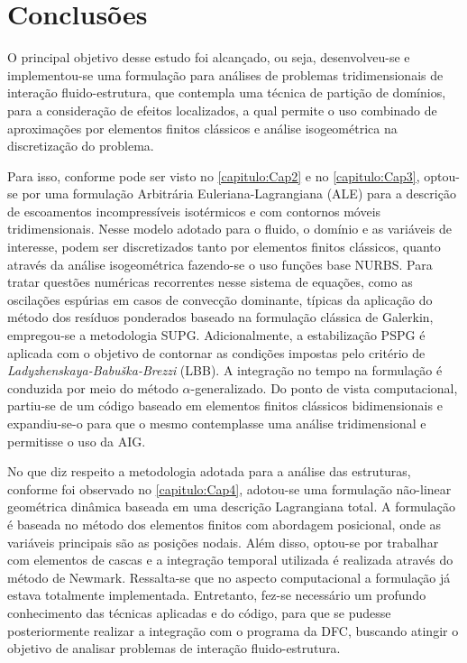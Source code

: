 \chapter{Conclusões} 

O principal objetivo desse estudo foi alcançado, ou seja, desenvolveu-se e implementou-se uma formulação
para análises de problemas tridimensionais de interação fluido-estrutura, que contempla uma técnica de 
partição de domínios, para a consideração de efeitos localizados, a qual permite o uso combinado de aproximações por elementos finitos clássicos
e análise isogeométrica na discretização do problema.

Para isso, conforme pode ser visto no \autoref{capitulo:Cap2} e no \autoref{capitulo:Cap3}, optou-se por uma formulação Arbitrária Euleriana-Lagrangiana (ALE) para a descrição de escoamentos incompressíveis isotérmicos e com contornos móveis tridimensionais. Nesse modelo adotado para o fluido, o domínio e as variáveis de interesse, podem ser discretizados tanto por elementos finitos clássicos, quanto através da análise isogeométrica fazendo-se o uso funções base NURBS. Para tratar questões numéricas recorrentes nesse sistema de equações, como as oscilações espúrias em casos de convecção dominante, típicas da aplicação do método dos resíduos ponderados baseado na formulação clássica de Galerkin, empregou-se a metodologia SUPG. Adicionalmente, a estabilização PSPG é aplicada com o objetivo de contornar as condições impostas pelo critério de \textit{Ladyzhenskaya-Babuška-Brezzi} (LBB). A integração no tempo na formulação é conduzida por meio do método $\alpha$-generalizado. Do ponto de vista computacional, partiu-se de um código baseado em elementos finitos clássicos bidimensionais e expandiu-se-o para que o mesmo contemplasse uma análise tridimensional e permitisse o uso da AIG.  

No que diz respeito a metodologia adotada para a análise das estruturas, conforme foi observado no \autoref{capitulo:Cap4}, adotou-se uma formulação não-linear geométrica dinâmica baseada em uma descrição Lagrangiana total. A formulação é baseada no método dos elementos finitos com abordagem posicional, onde as variáveis principais são as posições nodais. Além disso, optou-se por trabalhar com elementos de cascas e a integração temporal utilizada é realizada através do método de Newmark. Ressalta-se que no aspecto computacional a formulação já estava totalmente implementada. Entretanto, fez-se necessário um profundo conhecimento das técnicas aplicadas e do código, para que se pudesse posteriormente realizar a integração com o programa da DFC, buscando atingir o objetivo de analisar problemas de interação fluido-estrutura.

